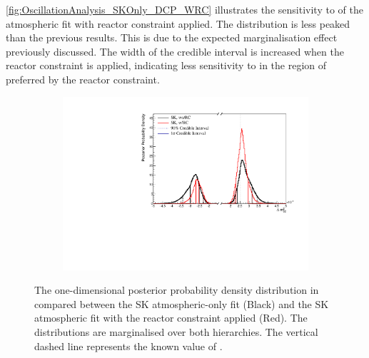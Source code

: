 \autoref{fig:OscillationAnalysis_SKOnly_DCP_WRC} illustrates the sensitivity to  of the atmospheric fit with reactor constraint applied. The distribution is less peaked than the previous results. This is due to the expected marginalisation effect previously discussed. The width of the \quickmath{1\sigma} credible interval is increased when the reactor constraint is applied, indicating less sensitivity to  in the region of  preferred by the reactor constraint.
\fi

\begin{figure}[h]
  \begin{subfigure}[t]{0.98\textwidth}
    \includegraphics[width=\textwidth, trim={0mm 0mm 0mm 0mm}, clip,page=1]{Figures/OA/SKOnlyFit_wRC/ContourComparison_1D_dm32_BH_2_wRC_woRC_UnSmeared_CredibleInterval.pdf}
  \end{subfigure}
  \caption{The one-dimensional posterior probability density distribution in  compared between the SK atmospheric-only fit (Black) and the SK atmospheric fit with the reactor constraint applied (Red). The distributions are marginalised over both hierarchies. The vertical dashed line represents the known value of .}
  \label{fig:OscillationAnalysis_SKOnly_DELM32_WRC}
\end{figure}

